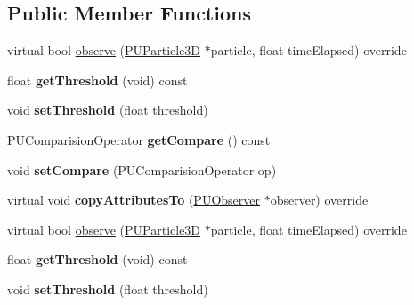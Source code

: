 \subsection*{Public Member Functions}
\begin{DoxyCompactItemize}
\item 
virtual bool \hyperlink{classPUOnVelocityObserver_a2719478a33935f6cafee11b72b1968bf}{observe} (\hyperlink{structPUParticle3D}{P\+U\+Particle3D} $\ast$particle, float time\+Elapsed) override
\item 
\mbox{\label{classPUOnVelocityObserver_acf7d5679ca0d590225bdff77a3d77ceb}} 
float {\bfseries get\+Threshold} (void) const
\item 
\mbox{\label{classPUOnVelocityObserver_a39f37cc269a86c96ed77a7165d8e5747}} 
void {\bfseries set\+Threshold} (float threshold)
\item 
\mbox{\label{classPUOnVelocityObserver_a160264b38605c7548c7ee64ab4a664b3}} 
P\+U\+Comparision\+Operator {\bfseries get\+Compare} () const
\item 
\mbox{\label{classPUOnVelocityObserver_a0a483eb57e4cff0624da42dbbac39d8e}} 
void {\bfseries set\+Compare} (P\+U\+Comparision\+Operator op)
\item 
\mbox{\label{classPUOnVelocityObserver_a72c28afa06ab8cd94e58e635c262d9b7}} 
virtual void {\bfseries copy\+Attributes\+To} (\hyperlink{classPUObserver}{P\+U\+Observer} $\ast$observer) override
\item 
virtual bool \hyperlink{classPUOnVelocityObserver_aac0680a7af1e86d54dbf17edc20f83b9}{observe} (\hyperlink{structPUParticle3D}{P\+U\+Particle3D} $\ast$particle, float time\+Elapsed) override
\item 
\mbox{\label{classPUOnVelocityObserver_acf7d5679ca0d590225bdff77a3d77ceb}} 
float {\bfseries get\+Threshold} (void) const
\item 
\mbox{\label{classPUOnVelocityObserver_a39f37cc269a86c96ed77a7165d8e5747}} 
void {\bfseries set\+Threshold} (float threshold)
\item 
\mbox{\label{classPUOnVelocityObserver_a160264b38605c7548c7ee64ab4a664b3}} 

\end{DoxyCompactItemize}
